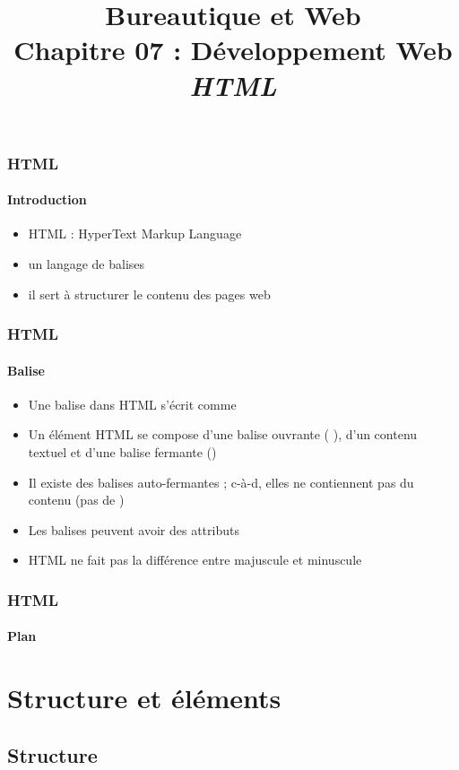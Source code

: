 \documentclass[xcolor=table]{beamer}
\title[BWEB : 07- HTML] %
{Bureautique et Web \\Chapitre 07 : Développement Web\\ \slshape\small  HTML}
\begin{document}
\begin{frame}
\frametitle{HTML}
\framesubtitle{Introduction}

\begin{itemize}
	\item HTML : HyperText Markup Language
	\item un langage de balises  
	\item il sert à structurer le contenu des pages web
\end{itemize}

\end{frame}

\begin{frame}
\frametitle{HTML}
\framesubtitle{Balise}

\begin{itemize}
	\item Une balise dans HTML s'écrit comme 
	\item Un élément HTML se compose d'une balise ouvrante ( ), d'un contenu textuel et d'une balise fermante ()
	\item Il existe des balises auto-fermantes ; c-à-d, elles ne contiennent pas du contenu (pas de )
	\item Les balises peuvent avoir des attributs \\
	\item HTML ne fait pas la différence entre majuscule et minuscule
\end{itemize}

\end{frame}


\begin{frame}
\frametitle{HTML}
\framesubtitle{Plan}

\begin{multicols}{2}
\tableofcontents
\end{multicols}
\end{frame}

\section{Structure et éléments}

\subsection{Structure}
\end{document}
